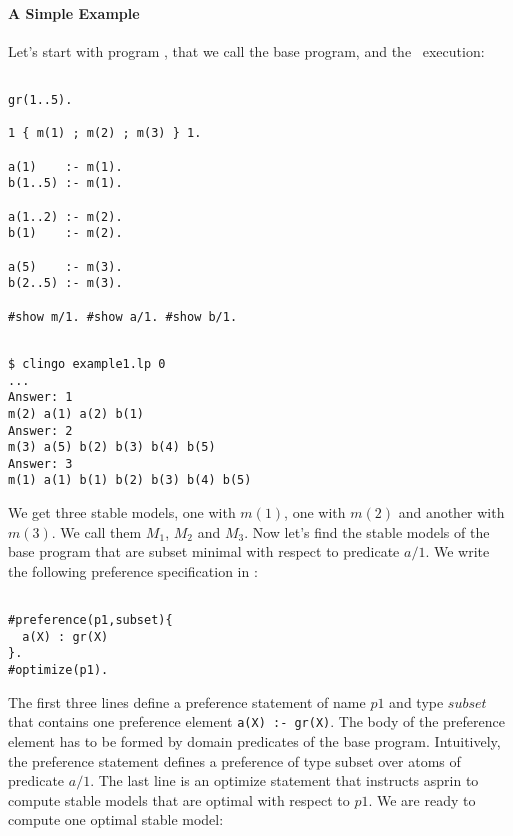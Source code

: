 

\paragraph{A Simple Example}

Let's start with program  , that we call the base program,  and the  \clingo\  execution: 
\begin{lstlisting}[numbers=none]

gr(1..5).

1 { m(1) ; m(2) ; m(3) } 1.   

a(1)    :- m(1).
b(1..5) :- m(1).

a(1..2) :- m(2).
b(1)    :- m(2).

a(5)    :- m(3).
b(2..5) :- m(3). 

#show m/1. #show a/1. #show b/1.
\end{lstlisting}
\begin{lstlisting}[numbers=none]

$ clingo example1.lp 0
...
Answer: 1
m(2) a(1) a(2) b(1) 
Answer: 2
m(3) a(5) b(2) b(3) b(4) b(5) 
Answer: 3
m(1) a(1) b(1) b(2) b(3) b(4) b(5)

\end{lstlisting}
We get three stable models, one with $m(1)$, one with $m(2)$ and another with $m(3)$. We call them $M_1$, $M_2$ and $M_3$. 
Now let's find the stable models of the base program that are subset minimal with respect to predicate $a/1$. 
We write the following preference specification in : 
\begin{lstlisting}[numbers=none]

#preference(p1,subset){                                                                                             
  a(X) : gr(X)                                                                                                    
}.
#optimize(p1).
\end{lstlisting}
The first three lines define a preference statement of name $p1$ and type $subset$ that contains one preference element 
\lstinline{a(X) :- gr(X)}. The body of the preference element has to be formed by domain predicates of the base program.
Intuitively, the preference statement defines a preference of type subset over atoms of predicate $a/1$. 
The last line is an optimize statement that instructs asprin to compute stable models that are optimal with respect to $p1$. 
We are ready to compute one optimal stable model: 
